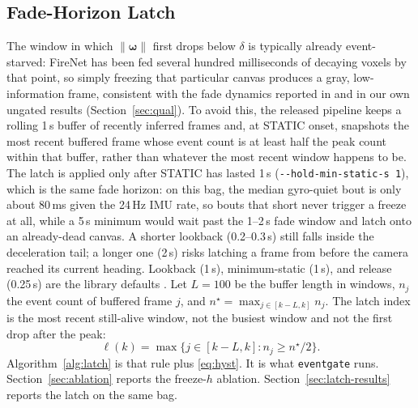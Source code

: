 \documentclass[journal]{IEEEtran}
\DeclareRobustCommand{\norm}[1]{\lVert #1 \rVert}
\begin{document}
\subsection{Fade-Horizon Latch}
\label{sec:latch}
The window in which \(\norm{\boldsymbol{\omega}}\) first drops below \(\delta\) is
typically already event-starved: FireNet has been fed several hundred
milliseconds of decaying voxels by that point, so simply freezing that
particular canvas produces a gray, low-information frame, consistent with the
fade dynamics reported in \cite{scheerlinck2020} and in our own ungated results
(Section~\ref{sec:qual}). To avoid this, the released pipeline keeps a rolling
1\,s buffer of recently inferred frames and, at STATIC onset, snapshots the most
recent buffered frame whose event count is at least half the peak count within
that buffer, rather than whatever the most recent window happens to be. The
latch is applied only after STATIC has lasted 1\,s
(\texttt{-{}-hold-min-static-s 1}), which is the same fade horizon: on this bag,
the median gyro-quiet bout is only about 80\,ms given the 24\,Hz IMU rate, so
bouts that short never trigger a freeze at all, while a 5\,s minimum would wait
past the 1--2\,s fade window and latch onto an already-dead canvas. A shorter
lookback (0.2--0.3\,s) still falls inside the deceleration tail; a longer one
(2\,s) risks latching a frame from before the camera reached its current
heading. Lookback (1\,s), minimum-static (1\,s), and release (0.25\,s) are the
library defaults \cite{libeventgate}. Let \(L=100\) be the buffer length in
windows, \(n_j\) the event count of buffered frame \(j\), and
\(n^\star = \max_{j\in[k-L,k]} n_j\). The latch index is the most recent
still-alive window, not the busiest window and not the first drop after the
peak:
\begin{equation}
\label{eq:latch}
\ell(k)
= \max\bigl\{ j \in [k-L,k] : n_j \ge n^\star/2 \bigr\}.
\end{equation}
Algorithm~\ref{alg:latch} is that rule plus \eqref{eq:hyst}. It is what
\texttt{eventgate} runs. Section~\ref{sec:ablation} reports the freeze-\(h\)
ablation. Section~\ref{sec:latch-results} reports the latch on the same bag.
\end{document}
